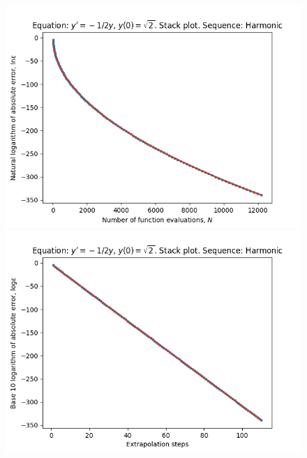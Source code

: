 \begin{figure}[H]
\centering
\begin{minipage}{0.45\textwidth}
\centering
\includegraphics[scale=0.45]{../results/emr_plots/quad_sing_0_hp_harmonic_stack.png}
\end{minipage}
\begin{minipage}{0.45\textwidth}
\centering
\includegraphics[scale=0.45]{../results/emr_plots/quad_sing_0_hp_harmonic_steps_stack.png}
\end{minipage}
\end{figure}

